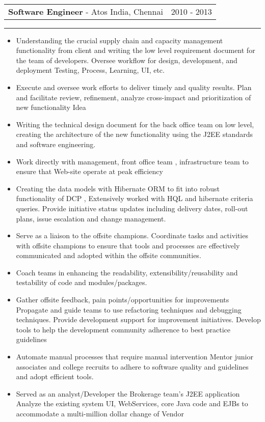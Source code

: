 \documentclass[10pt,A4]{article}
\newcommand{\cvevent}[4]
{

\begin{tabular*}{1\textwidth}{p{13.6cm}  x{3.9cm}}
	\textbf{#2} - \textcolor{bgcol}{#3} &   \vspace{2.0pt}\textcolor{sectcol}{#1}
\end{tabular*}

\vspace{-8pt}
\textcolor{softcol}{\hrule}
\vspace{6pt}

  #4 

}
\begin{document}
{\begin{itemize}
\end{itemize}
}

\ \\ 

\cvevent{2010 - 2013}
{Software Engineer}
{Atos India, Chennai}
{

\begin{itemize}
\item Understanding the crucial supply chain and capacity management functionality from
client and writing the low level requirement document for the team of developers.
Oversee workflow for design, development, and deployment Testing, Process, Learning,
UI, etc.
\item Execute and oversee work efforts to deliver timely and quality results.
Plan and facilitate review, refinement, analyze cross-impact and prioritization of new
functionality Idea
\item Writing the technical design document for the back office team on low level, creating
the architecture of the new functionality using the J2EE standards and software
engineering.
\item Work directly with management, front office team , infrastructure team to ensure that
Web-site operate at peak efficiency
\item Creating the data models with Hibernate ORM to fit into robust functionality of DCP ,
Extensively worked with HQL and hibernate criteria queries.
Provide initiative status updates including delivery dates, roll-out plans, issue escalation
and change management.
\item Serve as a liaison to the offsite champions. Coordinate tasks and activities with offsite
champions to ensure that tools and processes are effectively communicated and
adopted within the offsite communities.
\item Coach teams in enhancing the readability, extensibility/reusability and testability of
code and modules/packages.
\item Gather offsite feedback, pain points/opportunities for improvements
Propagate and guide teams to use refactoring techniques and debugging techniques.
Provide development support for improvement initiatives.
Develop tools to help the development community adherence to best practice
guidelines
\item Automate manual processes that require manual intervention
Mentor junior associates and college recruits to adhere to software quality and
guidelines and adopt efficient tools.
\item Served as an analyst/Developer the Brokerage team's J2EE application
Analyze the existing system UI, WebServices, core Java code and EJBs to accommodate
a multi-million dollar change of Vendor


\end{itemize}}
\end{document}
